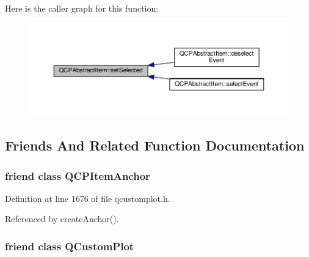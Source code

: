Here is the caller graph for this function\+:\nopagebreak
\begin{figure}[H]
\begin{center}
\leavevmode
\includegraphics[width=350pt]{class_q_c_p_abstract_item_a203de94ad586cc44d16c9565f49d3378_icgraph}
\end{center}
\end{figure}




\subsection{Friends And Related Function Documentation}
\hypertarget{class_q_c_p_abstract_item_a61767d414fd57af9eb1741b34268c7fc}{}
\subsubsection[{Q\+C\+P\+Item\+Anchor}]{\setlength{\rightskip}{0pt plus 5cm}friend class {\bf Q\+C\+P\+Item\+Anchor}\hspace{0.3cm}{\ttfamily [friend]}}\label{class_q_c_p_abstract_item_a61767d414fd57af9eb1741b34268c7fc}


Definition at line 1676 of file qcustomplot.\+h.



Referenced by create\+Anchor().

\hypertarget{class_q_c_p_abstract_item_a1cdf9df76adcfae45261690aa0ca2198}{}
\subsubsection[{Q\+Custom\+Plot}]{\setlength{\rightskip}{0pt plus 5cm}friend class {\bf Q\+Custom\+Plot}\hspace{0.3cm}{\ttfamily [friend]}}\label{class_q_c_p_abstract_item_a1cdf9df76adcfae45261690aa0ca2198}


